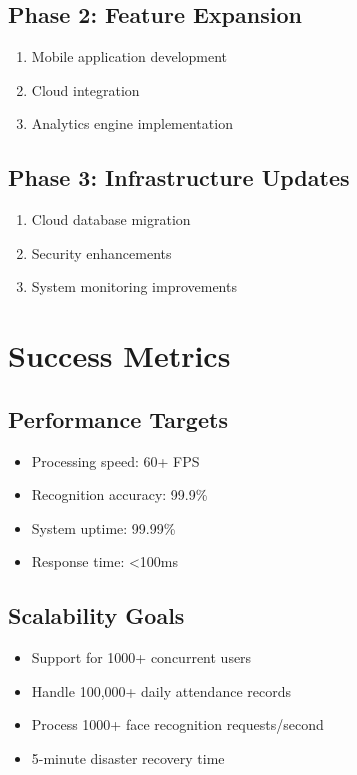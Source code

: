 \subsection{Phase 2: Feature Expansion}
\begin{enumerate}
    \item Mobile application development
    \item Cloud integration
    \item Analytics engine implementation
\end{enumerate}

\subsection{Phase 3: Infrastructure Updates}
\begin{enumerate}
    \item Cloud database migration
    \item Security enhancements
    \item System monitoring improvements
\end{enumerate}

\section{Success Metrics}

\subsection{Performance Targets}
\begin{itemize}
    \item Processing speed: 60+ FPS
    \item Recognition accuracy: 99.9\%
    \item System uptime: 99.99\%
    \item Response time: <100ms
\end{itemize}

\subsection{Scalability Goals}
\begin{itemize}
    \item Support for 1000+ concurrent users
    \item Handle 100,000+ daily attendance records
    \item Process 1000+ face recognition requests/second
    \item 5-minute disaster recovery time
\end{itemize}